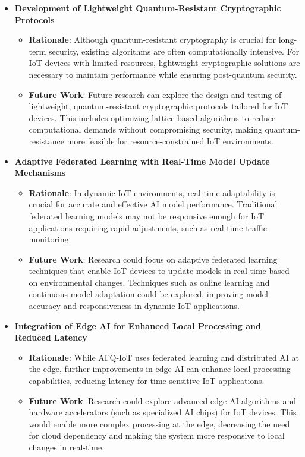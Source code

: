 \documentclass[12pt, oneside]{report}
\begin{document}
\begin{itemize}

  
    \item \textbf{Development of Lightweight Quantum-Resistant Cryptographic Protocols}
    \begin{itemize}
        \item \textbf{Rationale}: Although quantum-resistant cryptography is crucial for long-term security, existing algorithms are often computationally intensive. For IoT devices with limited resources, lightweight cryptographic solutions are necessary to maintain performance while ensuring post-quantum security.
        \item \textbf{Future Work}: Future research can explore the design and testing of lightweight, quantum-resistant cryptographic protocols tailored for IoT devices. This includes optimizing lattice-based algorithms to reduce computational demands without compromising security, making quantum-resistance more feasible for resource-constrained IoT environments.
    \end{itemize}

    \item \textbf{Adaptive Federated Learning with Real-Time Model Update Mechanisms}
    \begin{itemize}
        \item \textbf{Rationale}: In dynamic IoT environments, real-time adaptability is crucial for accurate and effective AI model performance. Traditional federated learning models may not be responsive enough for IoT applications requiring rapid adjustments, such as real-time traffic monitoring.
        \item \textbf{Future Work}: Research could focus on adaptive federated learning techniques that enable IoT devices to update models in real-time based on environmental changes. Techniques such as online learning and continuous model adaptation could be explored, improving model accuracy and responsiveness in dynamic IoT applications.
    \end{itemize}


    \item \textbf{Integration of Edge AI for Enhanced Local Processing and Reduced Latency}
    \begin{itemize}
        \item \textbf{Rationale}: While AFQ-IoT uses federated learning and distributed AI at the edge, further improvements in edge AI can enhance local processing capabilities, reducing latency for time-sensitive IoT applications.
        \item \textbf{Future Work}: Research could explore advanced edge AI algorithms and hardware accelerators (such as specialized AI chips) for IoT devices. This would enable more complex processing at the edge, decreasing the need for cloud dependency and making the system more responsive to local changes in real-time.
    \end{itemize}



\end{itemize}
\end{document}
